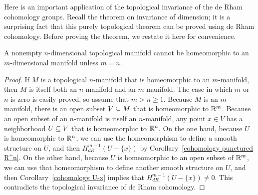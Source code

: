 Here is an important application of the topological invariance of the de Rham cohomology groups. Recall the theorem on invariance of dimension; it is a surprising fact that this purely topological theorem can be proved using de Rham cohomology. Before proving the theorem, we restate it here for convenience.
\begin{proposition}
A nonempty $n$-dimensional topological manifold cannot be homeomorphic to an $m$-dimensional manifold unless $m=n$.
\end{proposition}
\begin{proof}
If $M$ is a topological $n$-manifold that is homeomorphic to an $m$-manifold, then $M$ is itself both an $n$-manifold and an $m$-manifold. The case in which $m$ or $n$ is zero is easily proved, so assume that $m>n\geq 1$. Because $M$ is an $m$-manifold, there is an open subset $V\subseteq M$ that is homeomorphic to $\mathbb{R}^m$. Because an open subset of an $n$-manifold is itself an $n$-manifold, any point $x\in V$ has a neighborhood $U\subseteq V$ that is homeomorphic to $\mathbb{R}^n$. On the one hand, because $U$ is homeomorphic to $\mathbb{R}^n$, we can use the homeomorphism to define a smooth structure
on $U$, and then $H^{m-1}_{dR}(U-\{x\})$ by Corollary~\ref{cohomology punctured R^n}. On the other hand, because $U$ is homeomorphic to an open subset of $\mathbb{R}^m$, we can use that homeomorphism to define another smooth structure on $U$, and then Corollary~\ref{cohomology U-x} implies that $H^{m-1}_{dR}(U-\{x\})\neq 0$. This contradicts the topological invariance of de Rham cohomology.
\end{proof}
